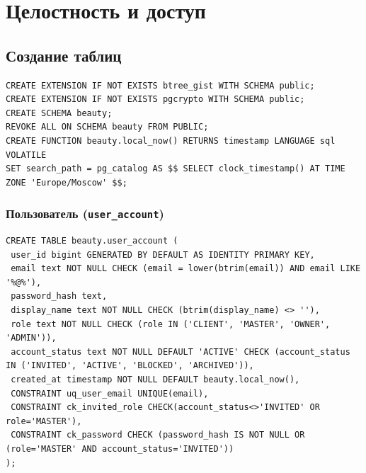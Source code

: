 \documentclass[11pt,a4paper]{article}
\begin{document}
\clearpage


\section{Целостность и доступ}
\subsection{Создание таблиц}
\begin{lstlisting}[style=sql]
CREATE EXTENSION IF NOT EXISTS btree_gist WITH SCHEMA public;
CREATE EXTENSION IF NOT EXISTS pgcrypto WITH SCHEMA public;
CREATE SCHEMA beauty;
REVOKE ALL ON SCHEMA beauty FROM PUBLIC;
CREATE FUNCTION beauty.local_now() RETURNS timestamp LANGUAGE sql VOLATILE
SET search_path = pg_catalog AS $$ SELECT clock_timestamp() AT TIME ZONE 'Europe/Moscow' $$;
\end{lstlisting}
\par\medskip\noindent\begin{minipage}{\linewidth}
\subsubsection*{Пользователь (\texttt{user\_\allowbreak{}account})}
\begin{lstlisting}[style=sql]
CREATE TABLE beauty.user_account (
 user_id bigint GENERATED BY DEFAULT AS IDENTITY PRIMARY KEY,
 email text NOT NULL CHECK (email = lower(btrim(email)) AND email LIKE '%@%'),
 password_hash text,
 display_name text NOT NULL CHECK (btrim(display_name) <> ''),
 role text NOT NULL CHECK (role IN ('CLIENT', 'MASTER', 'OWNER', 'ADMIN')),
 account_status text NOT NULL DEFAULT 'ACTIVE' CHECK (account_status IN ('INVITED', 'ACTIVE', 'BLOCKED', 'ARCHIVED')),
 created_at timestamp NOT NULL DEFAULT beauty.local_now(),
 CONSTRAINT uq_user_email UNIQUE(email),
 CONSTRAINT ck_invited_role CHECK(account_status<>'INVITED' OR role='MASTER'),
 CONSTRAINT ck_password CHECK (password_hash IS NOT NULL OR (role='MASTER' AND account_status='INVITED'))
);
\end{lstlisting}
\end{minipage}\par\medskip
\end{document}
